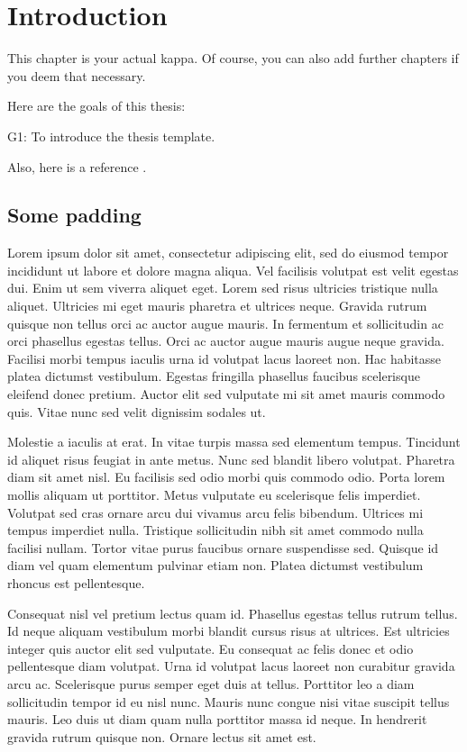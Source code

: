 \chapter{Introduction}
\label{chap:introduction}
This chapter is your actual kappa.
%
Of course, you can also add further chapters if you deem that necessary.

Here are the goals of this thesis:
\begin{LaTeXdescription}
 \item[G1:] To introduce the thesis template.
\end{LaTeXdescription}

Also, here is a reference \cite{liebel16sosym}.


\section{Some padding}

Lorem ipsum dolor sit amet, consectetur adipiscing elit, sed do eiusmod tempor incididunt ut labore et dolore magna aliqua. Vel facilisis volutpat est velit egestas dui. Enim ut sem viverra aliquet eget. Lorem sed risus ultricies tristique nulla aliquet. Ultricies mi eget mauris pharetra et ultrices neque. Gravida rutrum quisque non tellus orci ac auctor augue mauris. In fermentum et sollicitudin ac orci phasellus egestas tellus. Orci ac auctor augue mauris augue neque gravida. Facilisi morbi tempus iaculis urna id volutpat lacus laoreet non. Hac habitasse platea dictumst vestibulum. Egestas fringilla phasellus faucibus scelerisque eleifend donec pretium. Auctor elit sed vulputate mi sit amet mauris commodo quis. Vitae nunc sed velit dignissim sodales ut.

Molestie a iaculis at erat. In vitae turpis massa sed elementum tempus. Tincidunt id aliquet risus feugiat in ante metus. Nunc sed blandit libero volutpat. Pharetra diam sit amet nisl. Eu facilisis sed odio morbi quis commodo odio. Porta lorem mollis aliquam ut porttitor. Metus vulputate eu scelerisque felis imperdiet. Volutpat sed cras ornare arcu dui vivamus arcu felis bibendum. Ultrices mi tempus imperdiet nulla. Tristique sollicitudin nibh sit amet commodo nulla facilisi nullam. Tortor vitae purus faucibus ornare suspendisse sed. Quisque id diam vel quam elementum pulvinar etiam non. Platea dictumst vestibulum rhoncus est pellentesque.

Consequat nisl vel pretium lectus quam id. Phasellus egestas tellus rutrum tellus. Id neque aliquam vestibulum morbi blandit cursus risus at ultrices. Est ultricies integer quis auctor elit sed vulputate. Eu consequat ac felis donec et odio pellentesque diam volutpat. Urna id volutpat lacus laoreet non curabitur gravida arcu ac. Scelerisque purus semper eget duis at tellus. Porttitor leo a diam sollicitudin tempor id eu nisl nunc. Mauris nunc congue nisi vitae suscipit tellus mauris. Leo duis ut diam quam nulla porttitor massa id neque. In hendrerit gravida rutrum quisque non. Ornare lectus sit amet est.

